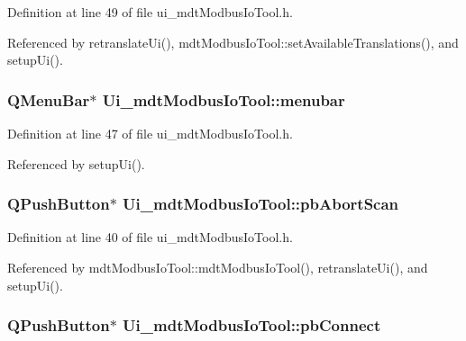Definition at line 49 of file ui\-\_\-mdt\-Modbus\-Io\-Tool.\-h.



Referenced by retranslate\-Ui(), mdt\-Modbus\-Io\-Tool\-::set\-Available\-Translations(), and setup\-Ui().

\hypertarget{class_ui__mdt_modbus_io_tool_a101030af93eae77dc80e69c6ad73b561}{
\subsubsection[{menubar}]{\setlength{\rightskip}{0pt plus 5cm}Q\-Menu\-Bar$\ast$ Ui\-\_\-mdt\-Modbus\-Io\-Tool\-::menubar}}\label{class_ui__mdt_modbus_io_tool_a101030af93eae77dc80e69c6ad73b561}


Definition at line 47 of file ui\-\_\-mdt\-Modbus\-Io\-Tool.\-h.



Referenced by setup\-Ui().

\hypertarget{class_ui__mdt_modbus_io_tool_a60a00c62dd6ba2fa09f0100aa27e8534}{
\subsubsection[{pb\-Abort\-Scan}]{\setlength{\rightskip}{0pt plus 5cm}Q\-Push\-Button$\ast$ Ui\-\_\-mdt\-Modbus\-Io\-Tool\-::pb\-Abort\-Scan}}\label{class_ui__mdt_modbus_io_tool_a60a00c62dd6ba2fa09f0100aa27e8534}


Definition at line 40 of file ui\-\_\-mdt\-Modbus\-Io\-Tool.\-h.



Referenced by mdt\-Modbus\-Io\-Tool\-::mdt\-Modbus\-Io\-Tool(), retranslate\-Ui(), and setup\-Ui().

\hypertarget{class_ui__mdt_modbus_io_tool_a68bab4d7e93a5f3d171b3b72957f1fd0}{
\subsubsection[{pb\-Connect}]{\setlength{\rightskip}{0pt plus 5cm}Q\-Push\-Button$\ast$ Ui\-\_\-mdt\-Modbus\-Io\-Tool\-::pb\-Connect}}\label{class_ui__mdt_modbus_io_tool_a68bab4d7e93a5f3d171b3b72957f1fd0}


